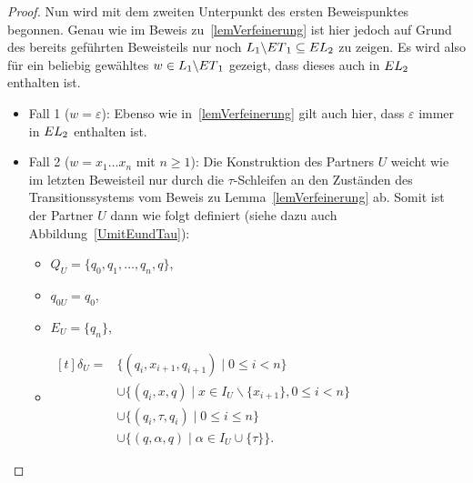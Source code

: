 \begin{proof}
  Nun wird mit dem zweiten Unterpunkt des ersten Beweispunktes begonnen. Genau
  wie im Beweis zu~\ref{lemVerfeinerung} ist hier jedoch auf Grund des bereits
  geführten Beweisteils nur noch $L_1\backslash ET{}_1\subseteq
  EL{}_2$ zu zeigen. Es wird also für ein beliebig gewähltes $w\in
  L_1\backslash ET{}_1$ gezeigt, dass dieses auch in $EL{}_2$ enthalten
  ist.
  \begin{itemize}
    \item Fall 1 ($w=\varepsilon$): Ebenso wie in~\ref{lemVerfeinerung} gilt
      auch hier, dass $\varepsilon$ immer in $EL{}_2$ enthalten ist.
    \item Fall 2 ($w=x_1\dots x_n$ mit $n\geq 1$): Die Konstruktion des
      Partners $U$ weicht wie im letzten Beweisteil nur durch die
      $\tau$-Schleifen an den Zuständen des Transitionssystems vom Beweis zu
      Lemma~\ref{lemVerfeinerung} ab. Somit ist der Partner $U$ dann wie folgt
      definiert (siehe dazu auch Abbildung~\ref{UmitEundTau}):
      \begin{itemize}
        \item $Q_U=\{q_0,q_1,\dots ,q_n,q\}$,
        \item $q_{0U}=q_0$,
        \item $E_U=\{q_n\}$,
        \item $\begin{aligned}[t]
            \delta _U=&\{(q_i,x_{i+1},q_{i+1})\mid 0\leq i< n\}\\
                      &\cup\{(q_i,x,q)\mid x\in I_U\backslash\{x_{i+1}\},0\leq
          i < n\}\\
          &\cup\{(q_i,\tau ,q_i)\mid 0\leq i\leq n\}\\
          &\cup\{(q,\alpha ,q)\mid \alpha\in I_U\cup \{\tau\}\}.
              \end{aligned}$
      \end{itemize}
      \begin{figure} [h!tbp]
      \begin{center}
\end{center}
\end{figure}
\end{itemize}
\end{proof}
